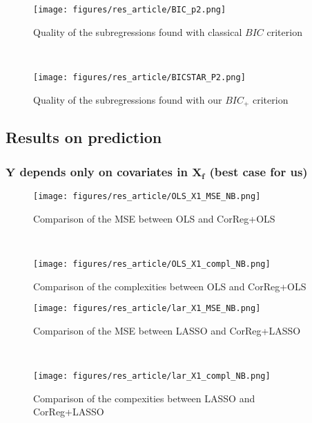 \documentclass[11pt,a4paper]{report}
\begin{document}
\begin{figure}[h!]
	\begin{minipage}[l]{.48\linewidth}
			\texttt{[image: figures/res\_article/BIC\_p2.png]} 
			\caption{Quality of the subregressions found with classical $BIC$ criterion}
	\end{minipage} \
   \begin{minipage}[r]{.48\linewidth}
			\texttt{[image: figures/res\_article/BICSTAR\_P2.png]} 
			\caption{Quality of the subregressions found with our $BIC_+$ criterion} 
   \end{minipage}
\end{figure}






\clearpage
\subsection{Results on prediction}

\subsubsection{$\boldsymbol{Y}$ depends only on covariates in $\boldsymbol{X_f}$ (best case for us)}	 \label{tableMSEsimgauche}
\begin{figure}[h!]
	\begin{minipage}[l]{.48\linewidth}
			\texttt{[image: figures/res\_article/OLS\_X1\_MSE\_NB.png]} 
			\caption{Comparison of the MSE between OLS and CorReg+OLS}
	\end{minipage} \
   \begin{minipage}[r]{.48\linewidth}
			\texttt{[image: figures/res\_article/OLS\_X1\_compl\_NB.png]} 
			\caption{Comparison of the complexities between OLS and CorReg+OLS} 
   \end{minipage}
\end{figure}
 

 \begin{figure}[h!]
	\begin{minipage}[l]{.48\linewidth}
			\texttt{[image: figures/res\_article/lar\_X1\_MSE\_NB.png]} 
			\caption{Comparison of the MSE between LASSO and CorReg+LASSO}
	\end{minipage} \
   \begin{minipage}[r]{.48\linewidth}
			\texttt{[image: figures/res\_article/lar\_X1\_compl\_NB.png]} 
			\caption{Comparison of the compexities between LASSO and CorReg+LASSO} 
   \end{minipage}
\end{figure}
\end{document}
